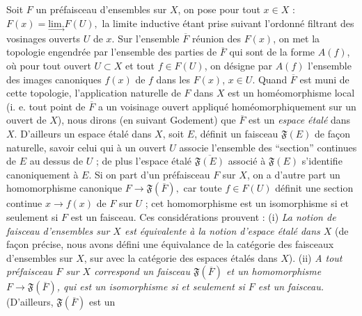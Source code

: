 Soit $F$ un préfaisceau d'ensembles sur $X$, on pose pour tout $x\in X$ :
$F(x)=\underset{\to}{\mathrm{lim.}}F(U),$
la limite inductive étant prise suivant l'ordonné filtrant des vosinages
ouverts $U$ de $x$. Sur l'ensemble $\overline F$ réunion des $F(x)$, on met
la topologie engendrée par l'ensemble des parties de $\overline F$ qui sont de
la forme $A(f)$, où pour tout ouvert $U\subset X$ et tout $f\in F(U)$, on
désigne par $A(f)$ l'ensemble des images canoniques $f(x)$ de $f$ dans les
$F(x)$, $x\in U$. Quand $\overline F$ est muni de cette topologie,
l'application naturelle de $F$ dans $X$ est un homéomorphisme local
(i. e. tout point de $\overline F$ a un voisinage ouvert appliqué
homéomorphiquement sur un ouvert de $X$), nous dirons (en suivant Godement)
que $\overline F$ est un \textit{espace étalé} dans $X$.
D'ailleurs un espace étalé dans $X$, soit $E$, définit un faisceau
$\mathfrak F(E)$ de façon naturelle, savoir celui qui à un ouvert $U$ associe
l'ensemble des ``section'' continues de $E$ au dessus de $U$ ; de plus
l'espace étalé $\overline{\mathfrak F(E)}$ associé à $\mathfrak F(E)$
s'identifie canoniquement à $E$. Si on part d'un préfaisceau $F$ sur $X$, on
a d'autre part un homomorphisme canonique
$F\to\mathfrak F(\overline F),$
car toute $f\in F(U)$ définit une section continue
$x\to f(x)$ de $F$ sur $U$ ; cet homomorphisme est un
isomorphisme si et seulement si $F$ est un faisceau. Ces considérations
prouvent : (i) \textit{La notion de faisceau d'ensembles sur $X$ est
équivalente à la notion d'espace étalé dans $X$} (de façon précise, nous avons
défini une équivalance de la catégorie des faisceaux d'ensembles sur $X$, sur
avec la catégorie des espaces étalés dans $X$).
(ii) \textit{A tout préfaisceau $F$ sur $X$ correspond un faisceau
$\mathfrak F(\overline F)$ et un homomorphisme
$F\to\mathfrak F(\overline F)$, qui est un isomorphisme si et
seulement si $F$ est un faisceau.} (D'ailleurs, $\mathfrak F(\overline F)$ est
un


